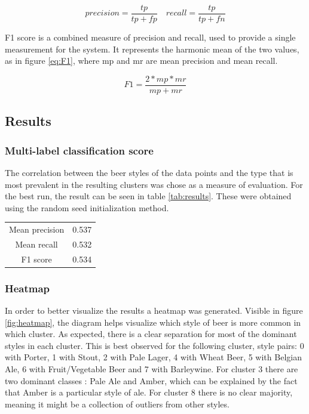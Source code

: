 \documentclass[12pt]{article}
\begin{document}
	\begin{equation}
	\label{eq:PrecRecall}
	precision = \frac{tp}{tp + fp} \quad recall = \frac{tp}{tp + fn}
	\end{equation}
	
	F1 score is a combined measure of precision and recall, used to provide a single measurement for the system. It represents the harmonic mean of the two values, as in figure \ref{eq:F1}, where mp and mr are mean precision and mean recall.
	
	\begin{equation}
	\label{eq:F1}
	F1 = \frac{2 * mp * mr}{mp + mr}
	\end{equation}
	
	\subsection{Results}
	\subsubsection{Multi-label classification score}
	The correlation between the beer styles of the data points and the type that is most prevalent in the resulting clusters was chose as a measure of evaluation. For the best run, the result can be seen in table \ref{tab:results}. These were obtained using the random seed initialization method.
	
	\begin{center}
		\label{tab:results}
		\begin{tabular}{ |c|c| } 
			\hline
			Mean precision & 0.537 \\
			Mean recall & 0.532 \\
			F1 score & 0.534 \\
			\hline
		\end{tabular}
	\end{center}

	\subsubsection{Heatmap}
	In order to better visualize the results a heatmap was generated. Visible in figure \ref{fig:heatmap}, the diagram helps visualize which style of beer is more common in which cluster. As expected, there is a clear separation for most of the dominant styles in each cluster. This is best observed for the following cluster, style pairs: 0 with Porter, 1 with Stout, 2 with Pale Lager, 4 with Wheat Beer, 5 with Belgian Ale, 6 with Fruit/Vegetable Beer and 7 with Barleywine. For cluster 3 there are two dominant classes : Pale Ale and Amber, which can be explained by the fact that Amber is a particular style of ale. For cluster 8 there is no clear majority, meaning it might be a collection of outliers from other styles.
	
\end{document}
